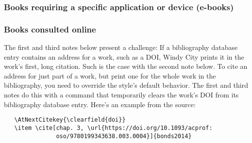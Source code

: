 \documentclass[11pt,letterpaper,oneside]{article}
\begin{document}
\begin{citebib}
\item \cite{author}
\item \cite[345--46]{writer}
\item \cite{contributor}
\end{citebib}

\setcounter{subsubsection}{158}
\subsubsection{Books requiring a specific application or device (e-books)}

\begin{citebib}
\item \cite{borel2015}
\end{citebib}

\setcounter{subsubsection}{160}
\subsubsection{Books consulted online}

The first and third notes below present a challenge: If a bibliography
database entry contains an address for a work, such as a DOI, Windy
City prints it in the work's first, long citation. Such is the case
with the second note below. To cite an address for just part of a
work, but print one for the whole work in the bibliography, you need
to override the style's default behavior. The first and third notes do
this with a command that temporarily clears the work's DOI from its
bibliography database entry. Here's an example from the source:

\begin{verbatim}
   \AtNextCitekey{\clearfield{doi}}
   \item \cite[chap. 3, \url{https://doi.org/10.1093/acprof:
               oso/9780199343638.003.0004}]{bonds2014}
\end{verbatim}

\begin{citebib}
\item \cite[chap. 3, \url{https://doi.org/10.1093/acprof:oso/9780199343638.003.0004}]{bonds2014}
\item \cite[59]{lystra2004}
\item \cite[chap. 11, \url{https://doi.org/10.1093/acprof:oso/9780199343638.003.0012}]{bonds2014}
\item \cite[60--61]{lystra2004}
\end{citebib}
\end{document}
